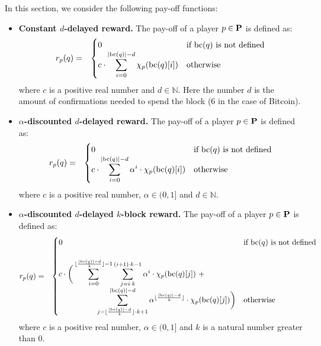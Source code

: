 In this section, we consider the following pay-off functions:
\begin{itemize}
\item {\bf Constant $d$-delayed reward.} The pay-off of a player $p \in \mathbf{P}$ is defined as:
\begin{eqnarray*}
r_p(q) & = & 
\begin{cases}
0 & \text{if } \text{bc}(q) \text{ is not defined}\\
{\displaystyle c \cdot \sum_{i=0}^{|\text{bc}(q)|-d} \chi_p(\text{bc}(q)[i])} & \text{otherwise}
\end{cases}
\end{eqnarray*}
where $c$ is a positive real number and $d \in \mathbb{N}$. Here the number $d$ is the amount of confirmations needed to spend the block (6 in the case of Bitcoin).

\item {\bf $\alpha$-discounted  $d$-delayed reward.} The pay-off of a player $p \in \mathbf{P}$ is defined as:
\begin{eqnarray*}
r_p(q) & = & 
\begin{cases}
0 & \text{if } \text{bc}(q) \text{ is not defined}\\
{\displaystyle c \cdot \sum_{i=0}^{|\text{bc}(q)|-d} \alpha^i \cdot \chi_p(\text{bc}(q)[i])} & \text{otherwise}
\end{cases}
\end{eqnarray*}
where $c$ is a positive real number, $\alpha \in (0,1]$ and $d \in \mathbb{N}$. 

\item {\bf $\alpha$-discounted $d$-delayed $k$-block reward.} The pay-off of a player $p \in \mathbf{P}$ is defined as:
\begin{eqnarray*}
r_p(q) & = & 
\begin{cases}
0 & \text{if } \text{bc}(q) \text{ is not defined}\\
\\
{\displaystyle c \cdot \bigg(
\sum_{i=0}^{\lfloor\frac{|\text{bc}(q)|-d}{k}\rfloor-1}
\sum_{j=i \cdot k}^{(i+1) \cdot k -1} \alpha^i \cdot \chi_p(\text{bc}(q)[j])
\ +}\\
{\displaystyle  \hspace{50pt} \sum_{j= \lfloor\frac{|\text{bc}(q)|-d}{k}\rfloor \cdot k + 1}^{|\text{bc}(q)|-d} \alpha^{\lfloor\frac{|\text{bc}(q)|-d}{k}\rfloor} \cdot \chi_p(\text{bc}(q)[j])\bigg)}
& \text{otherwise}
\end{cases}
\end{eqnarray*}
where $c$ is a positive real number, $\alpha \in (0,1]$ and $k$ is a natural number greater than 0.
\end{itemize}

